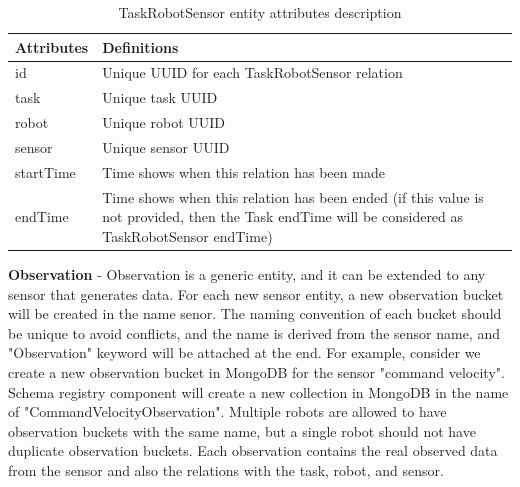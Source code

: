 	\begin{table}[!htbp]
		\begin{tabular}{|l|p{12cm}|}
			\hline
			\textbf{Attributes} & \textbf{Definitions} \\ \hline

			id &  Unique UUID for each TaskRobotSensor relation \\ \hline			
			task & Unique task UUID \\ \hline
			robot & Unique robot UUID \\ \hline
			sensor & Unique sensor UUID \\ \hline
			startTime & Time shows when this relation has been made \\ \hline
			endTime & Time shows when this relation has been ended (if this value is not provided, then the Task endTime will be considered as TaskRobotSensor endTime) \\ \hline
			
		\end{tabular}
		\caption{TaskRobotSensor entity attributes description}
		\label{tab:TaskRobotSensor}
	\end{table}

	\textbf{Observation} - Observation is a generic entity, and it can be extended to any sensor that generates data. For each new sensor entity, a new observation bucket will be created in the name senor. The naming convention of each bucket should be unique to avoid conflicts, and the name is derived from the sensor name, and "Observation" keyword will be attached at the end. For example, consider we create a new observation bucket in MongoDB for the sensor "command velocity". Schema registry component will create a new collection in MongoDB in the name of "CommandVelocityObservation". Multiple robots are allowed to have observation buckets with the same name, but a single robot should not have duplicate observation buckets. Each observation contains the real observed data from the sensor and also the relations with the task, robot, and sensor.

